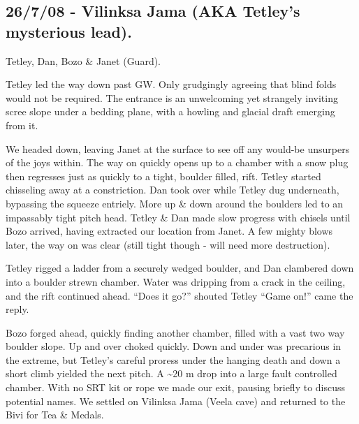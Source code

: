 \subsection{26/7/08 - Vilinksa Jama (AKA Tetley's mysterious
lead).}

Tetley, Dan, Bozo \& Janet (Guard).

Tetley led the way down past GW. Only grudgingly agreeing that blind
folds would not be required. The entrance is an unwelcoming yet
strangely inviting scree slope under a bedding plane, with a howling and
glacial draft emerging from it.

We headed down, leaving Janet at the surface to see off any would-be
unsurpers of the joys within. The way on quickly opens up to a chamber
with a snow plug then regresses just as quickly to a tight, boulder
filled, rift. Tetley started chisseling away at a constriction. Dan took
over while Tetley dug underneath, bypassing the squeeze entriely. More
up \& down around the boulders led to an impassably tight pitch head.
Tetley \& Dan made slow progress with chisels until Bozo arrived, having
extracted our location from Janet. A few mighty blows later, the way on
was clear (still tight though - will need more destruction).

Tetley rigged a ladder from a securely wedged boulder, and Dan clambered
down into a boulder strewn chamber. Water was dripping from a crack in
the ceiling, and the rift continued ahead. ``Does it go?'' shouted
Tetley ``Game on!'' came the reply.

Bozo forged ahead, quickly finding another chamber, filled with a vast
two way boulder slope. Up and over choked quickly. Down and under was
precarious in the extreme, but Tetley's careful proress under the
hanging death and down a short climb yielded the next pitch. A
\textasciitilde 20 m drop into a large fault controlled chamber. With no
SRT kit or rope we made our exit, pausing briefly to discuss potential
names. We settled on Vilinksa Jama (Veela cave) and returned to the Bivi
for Tea \& Medals. 

